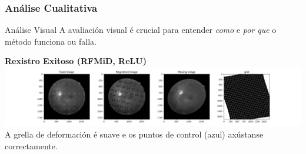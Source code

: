\documentclass[xcolor=dvipsnames]{beamer}
\begin{document}
\begin{frame}
    \frametitle{Análise Cualitativa}
    
    \begin{block}{Análise Visual}
        A avaliación visual é crucial para entender \textit{como} e \textit{por que} o método funciona ou falla.
    \end{block}

            \centering
            \textbf{Rexistro Exitoso (RFMiD, ReLU)}
            \includegraphics[width=\textwidth]{../imaxes/reg_examples/RFMID_MLP_buena.png}
            \small{A grella de deformación é suave e os puntos de control (azul) axústanse correctamente.}

    
\end{frame}


    
    
            
\end{document}
